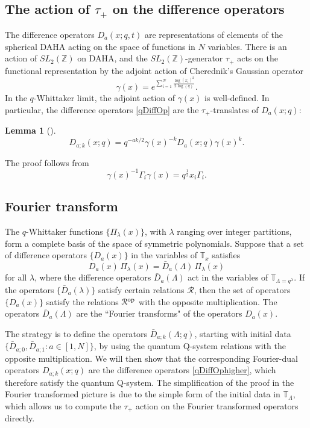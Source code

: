 \documentclass[12pt]{amsart}
\newtheorem{lemma}[thm]{Lemma}
\newcommand{\Z}{{\mathbb Z}}
\numberwithin{equation}{section}
\begin{document}
\subsection{The action of $\tau_+$ on the difference operators}\label{sec:25}
The difference operators $D_a(x;q,t)$ are representations of elements of the spherical DAHA acting on the space of functions in $N$ variables. There is an action of $SL_2(\Z)$ on DAHA, and the $SL_2(\Z)$-generator $\tau_+$ acts on the functional representation by the adjoint action of Cherednik's Gaussian operator \cite{Cheredbook}
\begin{equation}\label{gamma}
\gamma(x)=e^{\sum_{i=1}^N \frac{\log(x_i)^2}{2\log(q)}}.
\end{equation}
In the $q$-Whittaker limit, the adjoint action of $\gamma(x)$ is well-defined. In particular, the difference operators \eqref{qDiffOp} are the $\tau_+$-translates of $D_a(x;q)$:
\begin{lemma}[\cite{DFKqt}]
\begin{equation}
D_{a;k}(x;q) = q^{-a k/2} \gamma(x)^{-k} D_{a}(x;q) \gamma(x)^k.
\end{equation}
\end{lemma}
The proof follows from
$$
\gamma(x)^{-1} \Gamma_i \gamma(x) = q^{\frac12} x_i \Gamma_i.
$$


\subsection{Fourier transform}\label{sec:26}

The $q$-Whittaker functions $\{\Pi_\lambda(x)\}$, with $\lambda$ ranging over integer partitions, form a complete basis of the space of symmetric polynomials. Suppose that a set of difference operators $\{D_a(x)\}$ in the variables of $\mathbb T_x$ satisfies
$$
D_a(x)\, \Pi_\lambda(x) = \bar D_a(\Lambda) \, \Pi_\lambda(x)
$$
for all $\lambda$, where the difference operators $\bar D_a(\Lambda)$ act in the variables of $\mathbb T_{\Lambda=q^\lambda}$. If the operators $\{\bar D_a(\lambda)\}$ satisfy certain relations $\mathcal R$, then the set of operators $\{D_a(x)\}$ satisfy the relations $\mathcal R^{\rm op}$ with the opposite multiplication. The operators $\bar D_a(\Lambda)$ are the ``Fourier transforms" of the operators $D_a(x)$.

The strategy is to define the operators $\bar D_{a;k}(\Lambda;q)$, starting with initial data $\{\bar D_{a;0},\bar D_{a;1}: a\in[1,N]\}$, by using the quantum Q-system relations with the opposite multiplication. We will then show that the corresponding Fourier-dual operators $D_{a;k}(x;q)$ are the difference operators \eqref{qDiffOphigher}, which therefore satisfy the quantum Q-system. The simplification of the proof in the Fourier transformed picture is due to the simple form of the initial data in $\mathbb T_\Lambda$, which allows us to compute the $\tau_+$ action on the Fourier transformed operators directly.
\end{document}
